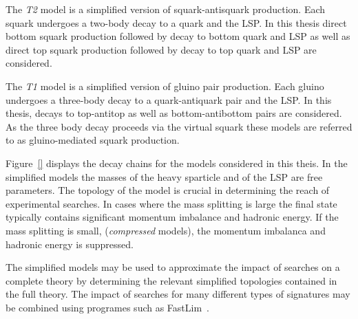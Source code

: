 The \emph{T2} model is a simplified version of squark-antisquark production. Each squark undergoes
a two-body decay to a quark and the LSP. In this thesis direct bottom squark production followed
by decay to bottom quark and LSP as well as direct top squark production followed by decay to top
quark and LSP are considered.

The \emph{T1} model is a simplified version of gluino pair production. Each gluino undergoes a three-body 
decay to a quark-antiquark pair and the LSP. In this thesis, decays to top-antitop as well as bottom-antibottom
pairs are considered. As the three body decay proceeds via the virtual squark these models 
are referred to as gluino-mediated squark production.

Figure~\ref{} displays the decay chains for the models considered in this theis. 
In the simplified models the masses of the heavy sparticle and of the LSP are free parameters.
The topology of the model is crucial in determining the reach of experimental searches. 
In cases where the mass splitting is large the final state typically contains significant
momentum imbalance and hadronic energy. If the mass splitting is small, (\emph{compressed} models),
the momentum imbalanca and hadronic energy is suppressed.

The simplified models may be used to approximate the impact of searches on a complete theory 
by determining the relevant simplified topologies contained in the full theory. The impact
of searches for many different types of signatures may be combined using programes 
such as FastLim~\cite{}.




